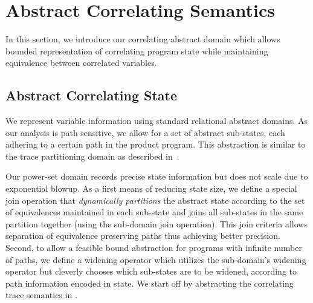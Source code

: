 \section{Abstract Correlating Semantics}

In this section, we introduce our correlating abstract domain which allows bounded representation of correlating program state while maintaining equivalence between correlated variables.

\subsection{Abstract Correlating State}

We represent variable information using standard relational abstract domains. As our analysis is path sensitive, we allow for a set of abstract sub-states, each adhering to a certain path in the product program. This abstraction is similar to the trace partitioning domain as described in~\cite{MauborgneRival07}.

Our power-set domain records precise state information but does not scale due to exponential blowup. As a first means of reducing state size, we define a special join operation that \emph{dynamically partitions} the abstract state according to the set of equivalences maintained in each sub-state and joins all sub-states in the same partition together (using the sub-domain join operation). This join criteria allows separation of equivalence preserving paths thus achieving better precision. Second, to allow a feasible bound abstraction for programs with infinite number of paths, we define a widening operator which utilizes the sub-domain's widening operator but cleverly chooses which sub-states are to be widened, according to path information encoded in state.
We start off by abstracting the correlating trace semantics in .

